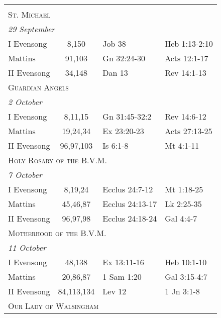 \begin{longtable}{l c l l}
\\
\\
\multicolumn{4}{l}{\textsc{St. Michael}}\\
\multicolumn{4}{l}{\textit{29 September}}\\
\hspace{1em} I Evensong&8,150&Job 38&Heb 1:13-2:10\\
\hspace{1em} Mattins&91,103&Gn 32:24-30&Acts 12:1-17\\
\hspace{1em} II Evensong&34,148&Dan 13&Rev 14:1-13\\
%
\multicolumn{4}{l}{\textsc{Guardian Angels}}\\
\multicolumn{4}{l}{\textit{2 October}}\\
\hspace{1em} I Evensong&8,11,15&Gn 31:45-32:2&Rev 14:6-12\\
\hspace{1em} Mattins&19,24,34&Ex 23:20-23&Acts 27:13-25\\
\hspace{1em} II Evensong&96,97,103&Is 6:1-8&Mt 4:1-11\\
%
\multicolumn{4}{l}{\textsc{Holy Rosary of the B.V.M.}}\\
\multicolumn{4}{l}{\textit{7 October}}\\
\hspace{1em} I Evensong&8,19,24&Ecclus 24:7-12&Mt 1:18-25\\
\hspace{1em} Mattins&45,46,87&Ecclus 24:13-17&Lk 2:25-35\\
\hspace{1em} II Evensong&96,97,98&Ecclus 24:18-24&Gal 4:4-7\\
%
\multicolumn{4}{l}{\textsc{Motherhood of the B.V.M.}}\\
\multicolumn{4}{l}{\textit{11 October}}\\
\hspace{1em} I Evensong&48,138&Ex 13:11-16&Heb 10:1-10\\
\hspace{1em} Mattins&20,86,87&1 Sam 1:20&Gal 3:15-4:7\\
\hspace{1em} II Evensong&84,113,134&Lev 12&1 Jn 3:1-8\\
%
\multicolumn{4}{l}{\textsc{Our Lady of Walsingham}}\\

\end{longtable}
